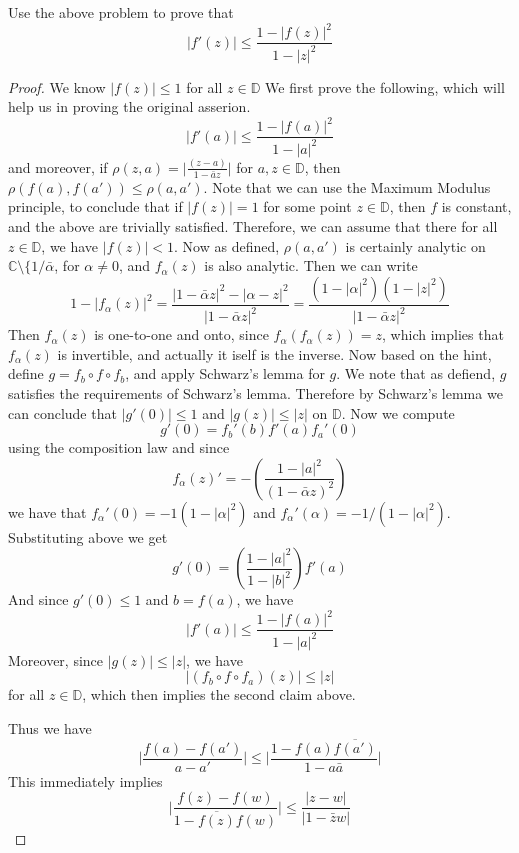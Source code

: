 \documentclass{article}[12pt]
\def\DD{\mathbb D}
\def\CC{{\mathbb C}}
\begin{document}
Use the above problem to prove that
\[
|f'(z)| \le \frac{1-|f(z)|^2}{1-|z|^2}
\]
\begin{proof}
  We  know $|f(z)| \le 1$ for all $z\in \DD$
  We first prove the following, which will help us in proving the original
  asserion.
  \[
  |f'(a)| \le \frac {1-|f(a)|^2}{1-|a|^2}
  \]
  and moreover, if $\rho(z,a) = \lvert \frac{(z-a)}{1-\bar{a}z}\rvert$ for $a,z\in \DD$,
  then $\rho(f(a),f(a'))\le \rho(a,a')$.
  Note that we can use the Maximum Modulus principle, to conclude that if $|f(z)|=1$
  for some point $z\in\DD$, then $f$ is constant, and the above are trivially
  satisfied. Therefore, we can assume that there for all $z\in\DD$, we have
  $|f(z)|< 1$. Now as defined, $\rho(a,a')$ is certainly analytic
  on $\CC\setminus\{1/\bar{\alpha}$, for $\alpha\ne 0$, and $f_\alpha(z)$ is also
  analytic. Then we can write
  \[
  1-|f_\alpha(z)|^2 = \frac{|1-\bar{\alpha}z|^2-|\alpha-z|^2}{|1-\bar{\alpha}z|^2} =
  \frac{(1-|\alpha|^2)(1-|z|^2)}{|1-\bar{\alpha}z|^2}
  \]
  Then $f_\alpha(z)$ is one-to-one and onto, since $f_\alpha(f_\alpha(z))=z$, which implies
  that $f_\alpha(z)$ is invertible, and actually it iself is the inverse. Now based
  on the hint, define $g=f_b \circ f \circ f_b$, and apply Schwarz's lemma for $g$.
  We note that as defiend, $g$ satisfies the requirements of Schwarz's lemma. Therefore
  by Schwarz's lemma we can conclude that $|g'(0)| \le 1$ and $|g(z)| \le |z|$ on
  $\DD$. Now we compute
  \[
  g'(0) = f_b'(b)f'(a)f_a'(0)
  \] using the composition law and since
  \[
  f_\alpha(z)' = -\left(\frac{1-|a|^2}{(1-\bar{\alpha}z)^2}\right)
  \]
  we have that $f_\alpha'(0)=-1(1-|\alpha|^2)$ and $f_\alpha'(\alpha)=-1/(1-|\alpha|^2)$.
  Substituting above we get
  \[
  g'(0) = \left( \frac{1-|a|^2}{1-|b|^2}\right) f'(a)
  \]
  And since $g'(0)\le 1$ and $b=f(a)$, we have
  \[
  |f'(a)| \le \frac {1-|f(a)|^2}{1-|a|^2}
  \]
  Moreover, since $|g(z)|\le |z|$, we have
  \[
  |(f_b \circ f \circ f_a)(z)| \le |z|
  \] for all $z\in\DD$, which then implies the second claim above.

  Thus we have
  \[
  \lvert \frac{f(a)-f(a')}{a-a'}\rvert \le \lvert \frac{1-f(a)\overline{f(a')}}{1-a\bar{a}}\rvert
  \]
  This immediately implies
\[
\lvert \frac{f(z)-f(w)}{1-\overline{f(z)}f(w)}\rvert \le
\frac{\lvert z-w\rvert}{\lvert 1-\bar{z}w\rvert}
\]
\end{proof}
\end{document}
